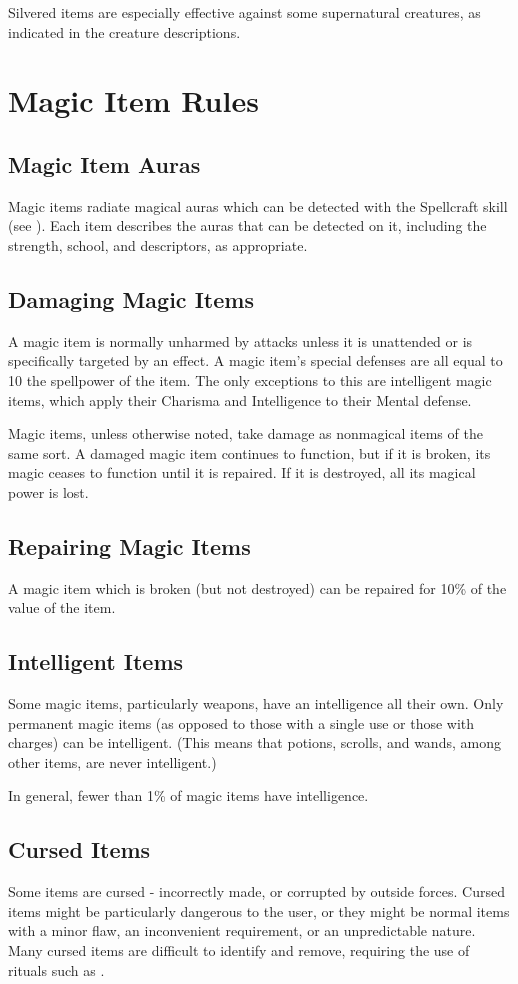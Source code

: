 Silvered items are especially effective against some supernatural creatures, as indicated in the creature descriptions.

\section{Magic Item Rules}

\subsection{Magic Item Auras}

Magic items radiate magical auras which can be detected with the Spellcraft skill (see ).
Each item describes the auras that can be detected on it, including the strength, school, and descriptors, as appropriate.

\subsection{Damaging Magic Items}

A magic item is normally unharmed by attacks unless it is unattended or is specifically targeted by an effect.
A magic item's special defenses are all equal to 10 \add the spellpower of the item.
The only exceptions to this are intelligent magic items, which apply their Charisma and Intelligence to their Mental defense.

Magic items, unless otherwise noted, take damage as nonmagical items of the same sort.
A damaged magic item continues to function, but if it is broken, its magic ceases to function until it is repaired.
If it is destroyed, all its magical power is lost.

\subsection{Repairing Magic Items}

A magic item which is broken (but not destroyed) can be repaired for 10\% of the value of the item.

\subsection{Intelligent Items}

Some magic items, particularly weapons, have an intelligence all their own.
Only permanent magic items (as opposed to those with a single use or those with charges) can be intelligent.
(This means that potions, scrolls, and wands, among other items, are never intelligent.)

In general, fewer than 1\% of magic items have intelligence.

\subsection{Cursed Items}

Some items are cursed - incorrectly made, or corrupted by outside forces.
Cursed items might be particularly dangerous to the user, or they might be normal items with a minor flaw, an inconvenient requirement, or an unpredictable nature.
Many cursed items are difficult to identify and remove, requiring the use of rituals such as .
